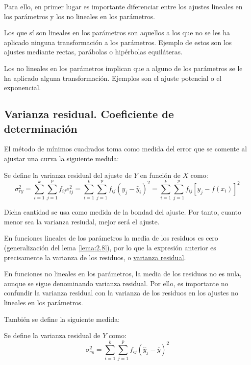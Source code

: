Para ello, en primer lugar es importante diferenciar entre los ajustes lineales en los parámetros y los no lineales en los parámetros.

Los que sí son lineales en los parámetros son aquellos a los que no se les ha aplicado ninguna transformación a los parámetros. Ejemplo de estos son los ajustes mediante rectas, parábolas o hipérbolas equiláteras.

Los no lineales en los parámetros implican que a alguno de los parámetros se le ha aplicado alguna transformación. Ejemplos son el ajuste potencial o el exponencial.

\subsection{Varianza residual. Coeficiente de determinación}

El método de mínimos cuadrados toma como medida del error que se comente al ajustar una curva la siguiente medida:
\begin{definicion}

    Se define la varianza residual del ajuste de $Y$ en función de $X$ como:
    $$\sigma_{ry}^2 = \sum_{i=1}^k \sum_{j=1}^p f_{ij} e_{ij}^2 = \sum_{i=1}^k \sum_{j=1}^p f_{ij}(y_j - \hat y_i)^2 = \sum_{i=1}^k \sum_{j=1}^p
    f_{ij} [y_j - f(x_i)]^2$$
\end{definicion}

Dicha cantidad se usa como medida de la bondad del ajuste. Por tanto, cuanto menor sea la varianza resiudal, mejor será el ajuste.
\begin{observacion}
    En funciones lineales de los parámetros la media de los residuos es cero (generalización del lema \ref{lema:2.8}), por lo que la expresión anterior es precisamente la varianza de los residuos, o \underline{varianza residual}.
    
    En funciones no lineales en los
    parámetros, la media de los residuos no es nula, aunque se sigue denominando varianza residual. Por ello, es importante no confundir la varianza residual con la varianza de los residuos en los ajustes no lineales en los parámetros.
\end{observacion}\bigskip


También se define la siguiente medida:
\begin{definicion}

    Se define la varianza residual de $Y$ como:
    \begin{equation*}
        \sigma_{ey}^2=\sum_{i=1}^k \sum_{j=1}^p f_{ij}
    (\hat y_j - \overline{y})^2
    \end{equation*}
\end{definicion}


